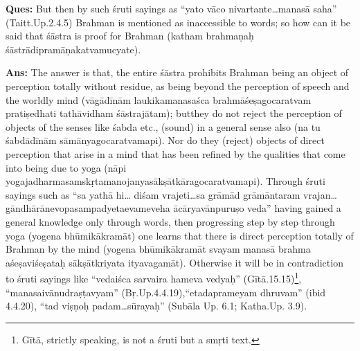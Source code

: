 \textbf{Ques:} But then by such śruti sayings as “yato vāco nivartante…manasā saha” (Taitt.Up.2.4.5) Brahman is mentioned as inaccessible to words; so how can it be said that  śāstra is proof for Brahman (katham brahmaṇaḥ śāstrādipramāṇakatvamucyate).

\vskip -2pt

\textbf{Ans:} The answer is that, the entire śāstra prohibits Brahman being an object of perception totally without residue, as being beyond the perception of speech and the worldly mind (vāgādīnām laukikamanasaśca brahmāśeṣagocaratvam pratiṣedhati tathāvidham śāstrajātam); but\break they do not reject the perception of objects of the senses like śabda etc., (sound) in a general sense also (na tu śabdādīnām sāmānyagocaratvamapi). Nor do they (reject) objects of direct perception that arise in a mind that has been refined by the qualities that come into being due to yoga (nāpi yogajadharmasamskṛtamanojanyasākṣātkāragocaratvamapi). Through śruti sayings such as “sa yathā hi… diśam vrajeti…sa grāmād grāmāntaram vrajan…gāndhārānevopasampadyeta\break evameveha ācāryavānpuruṣo veda” having gained a general knowledge only through words, then progressing step by step through yoga (yogena bhūmikākramāt) one learns that there is direct perception totally of Brahman by the mind (yogena bhūmikākramāt svayam manasā brahma aśeṣaviśeṣataḥ sākṣātkriyata ityavagamāt). Otherwise it will be in contradiction to śruti sayings like “vedaiśca sarvaira hameva vedyaḥ” (Gītā.15.15)\footnote{Gītā, strictly speaking, is not a śruti but a smṛti text.}, “manasaivānudraṣṭavyam” (Bṛ.Up.4.4.19),\break “etadaprameyam dhruvam” (ibid 4.4.20), “tad viṣṇoḥ padam…sūrayaḥ” (Subāla Up. 6.1; Katha.Up. 3.9).

\vskip -2pt


\vskip -2pt


